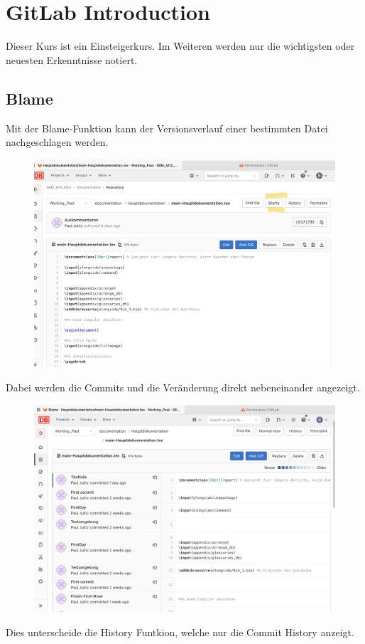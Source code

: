 \section{GitLab Introduction}
Dieser Kurs ist ein Einsteigerkurs. Im Weiteren werden nur die wichtigsten oder neuesten Erkenntnisse notiert.

\subsection{Blame}

Mit der Blame-Funktion kann der Versionsverlauf einer bestimmten Datei nachgeschlagen werden.

\begin{figure}[H]
	\centering
	\includegraphics[width=0.7\linewidth]{attachment/chapter_5/Scc009}
\end{figure}

Dabei werden die Commits und die Veränderung direkt nebeneinander angezeigt.

\begin{figure}[H]
	\centering
	\includegraphics[width=0.7\linewidth]{attachment/chapter_5/Scc008}
\end{figure}

Dies unterscheide die History Funtkion, welche nur die Commit History anzeigt.

